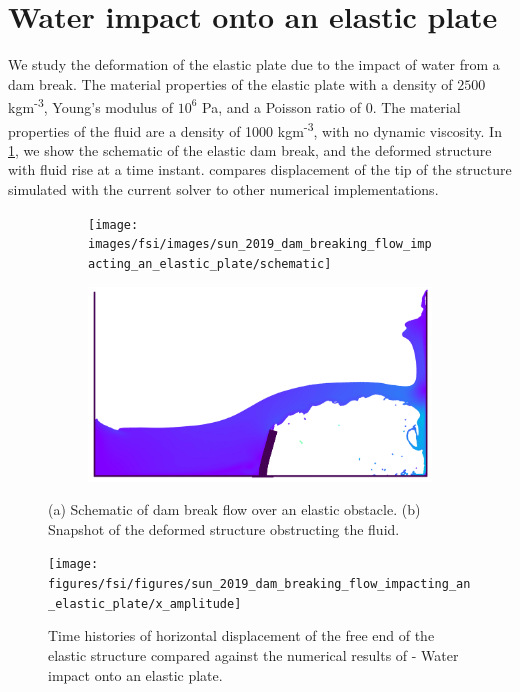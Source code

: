 \section{Water impact onto an elastic plate}
\label{sec:water-impact-forefront}
We study the deformation of the elastic plate due to the impact of water from a
dam break. The material properties of the elastic plate with a density of $2500$
kgm\textsuperscript{-3}, Young's modulus of $10^6$ Pa, and a Poisson ratio of
$0$. The material properties of the fluid are a density of 1000
kgm\textsuperscript{-3}, with no dynamic viscosity. In
\cref{fig:dam-breaking-onto-plate-snapshot}, we show the schematic of the elastic
dam break, and the deformed structure with fluid rise at a time instant.
 compares displacement of
the tip of the structure simulated with the current solver to other numerical
implementations.
\begin{figure}[!htpb]
    \centering
  \begin{subfigure}{0.48\textwidth}
    \centering
    \texttt{[image: images/fsi/images/sun\_2019\_dam\_breaking\_flow\_impacting\_an\_elastic\_plate/schematic]}
    \caption{}
  \end{subfigure}
  \begin{subfigure}{0.48\textwidth}
    \centering
        \includegraphics[scale=0.4]{figures/fsi/figures/sun_2019_dam_breaking_flow_impacting_an_elastic_plate/snap_t_2.png}
        \caption{}
  \end{subfigure}
    \caption
    { (a) Schematic of dam break flow over an elastic obstacle. (b) Snapshot of
      the deformed structure obstructing the fluid. }
    \label{fig:dam-breaking-onto-plate-snapshot}
\end{figure}
\begin{figure}[!htpb]
  \centering
  \texttt{[image: figures/fsi/figures/sun\_2019\_dam\_breaking\_flow\_impacting\_an\_elastic\_plate/x\_amplitude]}
  \caption{Time histories of horizontal displacement of the free end of the
    elastic structure compared against the numerical results of
    \citep{sun2019fully,bogaers2016evaluation}- Water impact onto an elastic
    plate.}
\label{fig:water-impact-plate-deflection-quantitative}
\end{figure}
